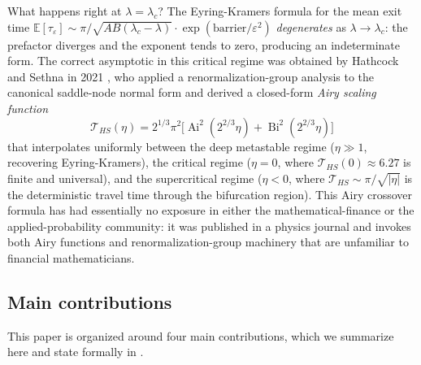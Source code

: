 \documentclass[11pt,a4paper]{article}
\theoremstyle{plain}
\theoremstyle{definition}
\newcommand{\E}{\mathbb{E}}
\newcommand{\Ai}{\operatorname{Ai}}
\newcommand{\Bi}{\operatorname{Bi}}
\begin{document}
What happens right at $\lambda = \lambda_c$? The Eyring-Kramers formula for the mean exit time $\E[\tau_\varepsilon] \sim \pi/\sqrt{AB(\lambda_c-\lambda)}\cdot\exp(\text{barrier}/\varepsilon^2)$ \emph{degenerates} as $\lambda \to \lambda_c$: the prefactor diverges and the exponent tends to zero, producing an indeterminate form.
The correct asymptotic in this critical regime was obtained by Hathcock and Sethna in 2021 \cite{HathcockSethna2021}, who applied a renormalization-group analysis to the canonical saddle-node normal form and derived a closed-form \emph{Airy scaling function}
$$\mathcal T_{HS}(\eta) = 2^{1/3}\pi^2\big[\Ai^2(2^{2/3}\eta) + \Bi^2(2^{2/3}\eta)\big]$$
that interpolates uniformly between the deep metastable regime ($\eta \gg 1$, recovering Eyring-Kramers), the critical regime ($\eta = 0$, where $\mathcal T_{HS}(0) \approx 6.27$ is finite and universal), and the supercritical regime ($\eta < 0$, where $\mathcal T_{HS} \sim \pi/\sqrt{|\eta|}$ is the deterministic travel time through the bifurcation region).
This Airy crossover formula has had essentially no exposure in either the mathematical-finance or the applied-probability community: it was published in a physics journal and invokes both Airy functions and renormalization-group machinery that are unfamiliar to financial mathematicians.

\subsection{Main contributions}

This paper is organized around four main contributions, which we summarize here and state formally in .
\end{document}

